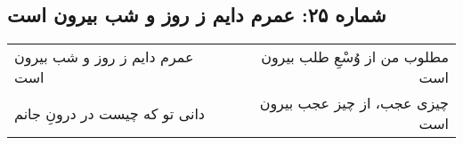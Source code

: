 \begin{center}
\section*{شماره ۲۵: عمرم دایم ز روز و شب بیرون است}
\label{sec:025}
\begin{longtable}{l p{0.5cm} r}
عمرم دایم ز روز و شب بیرون است
&&
مطلوب من از وُسْعِ طلب بیرون است
\\
دانی تو که چیست در درونِ جانم
&&
چیزی عجب، از چیز عجب بیرون است
\\
\end{longtable}
\end{center}
